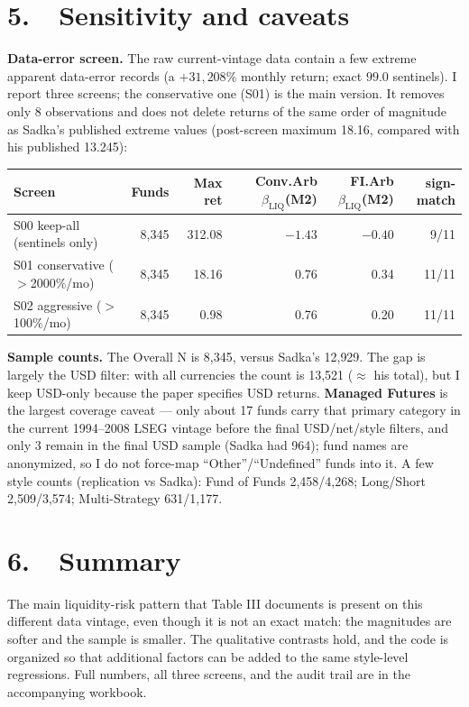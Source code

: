 \documentclass[10pt]{article}
\begin{document}
\section*{5.\ \ Sensitivity and caveats}
\textbf{Data-error screen.} The raw current-vintage data contain a few extreme apparent
data-error records (a $+31{,}208\%$ monthly return; exact $99.0$ sentinels). I report three
screens; the conservative one (S01) is the main version. It removes only 8 observations and does
not delete returns of the same order of magnitude as Sadka's published extreme values (post-screen
maximum 18.16, compared with his published 13.245):

{\footnotesize
\begin{center}
\begin{tabular}{l r r r r r}
\toprule
Screen & Funds & Max ret & Conv.Arb $\beta_{\text{LIQ}}$(M2) & FI.Arb $\beta_{\text{LIQ}}$(M2) & sign-match \\
\midrule
S00 keep-all (sentinels only) & 8{,}345 & 312.08 & $-1.43$ & $-0.40$ & 9/11 \\
S01 conservative ($>$2000\%/mo) & 8{,}345 & 18.16 & 0.76 & 0.34 & 11/11 \\
S02 aggressive ($>$100\%/mo) & 8{,}345 & 0.98 & 0.76 & 0.20 & 11/11 \\
\bottomrule
\end{tabular}
\end{center}}

\textbf{Sample counts.} The Overall N is 8{,}345, versus Sadka's 12{,}929. The gap is largely the
USD filter: with all currencies the count is 13{,}521 ($\approx$ his total), but I keep USD-only
because the paper specifies USD returns. \textbf{Managed Futures} is the largest coverage caveat
--- only about 17 funds carry that primary category in the current 1994--2008 LSEG vintage before
the final USD/net/style filters, and only 3 remain in the final USD sample (Sadka had 964); fund
names are anonymized, so I do not force-map ``Other''/``Undefined'' funds into it. A few style
counts (replication vs Sadka): Fund of Funds 2{,}458/4{,}268; Long/Short 2{,}509/3{,}574;
Multi-Strategy 631/1{,}177.

\section*{6.\ \ Summary}
The main liquidity-risk pattern that Table III documents is present on this different data vintage,
even though it is not an exact match: the magnitudes are softer and the sample is smaller. The
qualitative contrasts hold, and the code is organized so that additional factors can be added to
the same style-level regressions. Full numbers, all three screens, and the audit trail are in the
accompanying workbook.
\end{document}
